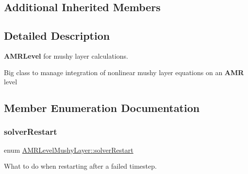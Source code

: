 \subsection*{Additional Inherited Members}


\subsection{Detailed Description}
\textbf{ A\+M\+R\+Level} for mushy layer calculations. 

Big class to manage integration of nonlinear mushy layer equations on an \textbf{ A\+MR} level 

\subsection{Member Enumeration Documentation}
\mbox{\label{class_a_m_r_level_mushy_layer_ae580be53bf92a5bad64ba0032282458b}} 
\subsubsection{\texorpdfstring{solver\+Restart}{solverRestart}}
{\footnotesize\ttfamily enum \hyperlink{class_a_m_r_level_mushy_layer_ae580be53bf92a5bad64ba0032282458b}{A\+M\+R\+Level\+Mushy\+Layer\+::solver\+Restart}\hspace{0.3cm}{\ttfamily [protected]}}



What to do when restarting after a failed timestep. 

